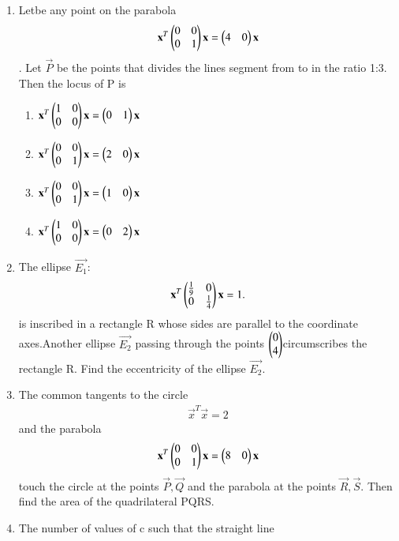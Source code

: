 \documentclass[journal,12pt,twocolumn]{IEEEtran}
\begin{document}
\begin{enumerate}[label=\arabic*]
\begin{enumerate}
    \end{enumerate}
    \item Letbe any point on the parabola 
    \begin{align} \mathbf{x}^T \begin{pmatrix}0 & 0 \\0 & 1\end{pmatrix}\mathbf{x}=\begin{pmatrix}4&0\end{pmatrix}\mathbf{x}
    \end{align}. Let $\vec{P}$ be the points that divides the lines segment from  to 	 in the ratio 1:3. Then the locus of P is 
    \begin{enumerate}
    \item $\mathbf{x}^T\begin{pmatrix}1 & 0 \\0 & 0\end{pmatrix}\mathbf{x}= \begin{pmatrix}0&1\end{pmatrix}\mathbf{x}$
    \item $\mathbf{x}^T \begin{pmatrix}0 & 0 \\0 & 1 \end{pmatrix} \mathbf{x}=\begin{pmatrix}2&0\end{pmatrix}\mathbf{x}$ 
    \item $\mathbf{x}^T\begin{pmatrix}0 & 0 \\0 & 1  \end{pmatrix} \mathbf{x}=\begin{pmatrix}1&0\end{pmatrix}\mathbf{x}$ 
    \item $\mathbf{x}^T \begin{pmatrix}1 & 0 \\0 & 0\end{pmatrix}\mathbf{x}= \begin{pmatrix}0&2\end{pmatrix}\mathbf{x}$ 
    \end{enumerate}
    \item The ellipse $\vec{E_1}$:
    \begin{align}\mathbf{x}^T\begin{pmatrix}\frac{1}{9} & 0 \\0 & \frac{1}{4}\end{pmatrix}\mathbf{x}=1.
    \end{align}is inscribed in a rectangle R whose sides are parallel to the coordinate axes.Another ellipse $\vec{E_2}$ passing through the points $\begin{pmatrix}0\\4\end{pmatrix} $circumscribes the rectangle R. Find the eccentricity of the ellipse $\vec{E_2}$.
    \item The common tangents to the circle 
    \begin{align}\vec{x}^T\vec{x}=2
    \end{align} and the parabola
    \begin{align}\mathbf{x}^T \begin{pmatrix}0 & 0 \\0 & 1\end{pmatrix} \mathbf{x}=\begin{pmatrix}8&0\end{pmatrix}\mathbf{x}
    \end{align} touch the circle at the points $\vec{P}, \vec{Q}$ and the parabola at the points 			$\vec{R},\vec{S}$. Then find the area of the quadrilateral PQRS.
    \item The number of values of c such that the straight line

\end{enumerate}
\end{document}
